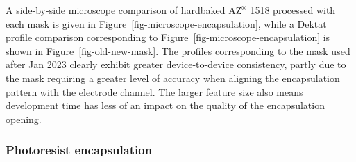 \documentclass[
  a4paper,
]{scrbook}
\begin{document}
A side-by-side microscope comparison of hardbaked AZ\(^\circledR\) 1518
processed with each mask is given in
Figure~\ref{fig-microscope-encapsulation}, while a Dektat profile
comparison corresponding to Figure~\ref{fig-microscope-encapsulation} is
shown in Figure~\ref{fig-old-new-mask}. The profiles corresponding to
the mask used after Jan 2023 clearly exhibit greater device-to-device
consistency, partly due to the mask requiring a greater level of
accuracy when aligning the encapsulation pattern with the electrode
channel. The larger feature size also means development time has less of
an impact on the quality of the encapsulation opening.

\hypertarget{photoresist-encapsulation}{%
\subsubsection*{Photoresist
encapsulation}\label{photoresist-encapsulation}}
\end{document}
